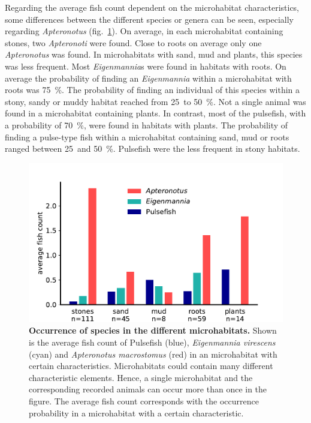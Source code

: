 Regarding the average fish count dependent on the microhabitat characteristics, some differences between the different species or genera can be seen, especially regarding \textit{Apteronotus} (fig.~\ref{fig:habitat_count_species}). On average, in each microhabitat containing stones, two \textit{Apteronoti} were found. Close to roots on average only one \textit{Apteronotus} was found. In microhabitats with sand, mud and plants, this species was less frequent.
Most \textit{Eigenmannia}s were found in habitats with roots. On average the probability of finding an \textit{Eigenmannia} within a microhabitat with roots was 75~\%. The probability of finding an individual of this species within a stony, sandy or muddy habitat reached from 25~to 50~\%. Not a single animal was found in a microhabitat containing plants.
In contrast, most of the pulsefish, with a probability of 70~\%, were found in habitats with plants. The probability of finding a pulse-type fish within a microhabitat containing sand, mud or roots ranged between 25~and 50~\%. Pulsefish were the less frequent in stony habitats.

\begin{figure}[H]
    \centering
    \includegraphics[width = \textwidth]{pictures/Results/average_occuranec_in_habitats.pdf}
    \caption{\textbf{Occurrence of species in the different microhabitats.}
    Shown is the average fish count of Pulsefish (blue), \textit{Eigenmannia virescens} (cyan) and \textit{Apteronotus macrostomus} (red) in an microhabitat with certain characteristics. Microhabitats could contain many different characteristic elements. Hence, a single microhabitat and the corresponding recorded animals can occur more than once in the figure. The average fish count corresponds with the occurrence probability in a microhabitat with a certain characteristic.}
    \label{fig:habitat_count_species}
\end{figure}

